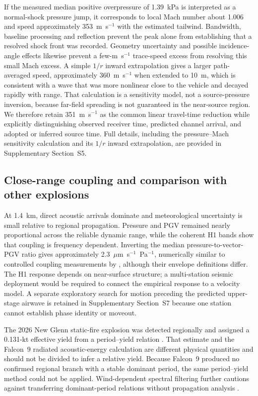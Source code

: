 \documentclass[]{seismica}
\begin{document}
If the measured median positive overpressure of 1.39~kPa is interpreted as
a normal-shock pressure jump, it corresponds to local Mach number about 1.006
and speed approximately 353~m~s$^{-1}$ with the estimated tailwind. Bandwidth,
baseline processing and reflection prevent the peak alone from establishing
that a resolved shock front was recorded. Geometry uncertainty and possible
incidence-angle effects likewise prevent a few-m~s$^{-1}$ trace-speed excess
from resolving this small Mach excess. A simple $1/r$ inward extrapolation gives a larger
path-averaged speed, approximately 360~m~s$^{-1}$ when extended to 10~m, which
is consistent with a wave that was more nonlinear close to the vehicle and
decayed rapidly with range. That calculation is a sensitivity model, not a
source-pressure inversion, because far-field spreading is not guaranteed in
the near-source region. We therefore retain 351~m~s$^{-1}$ as the common linear
travel-time reduction while explicitly distinguishing observed receiver time,
predicted channel arrival, and adopted or inferred source time. Full details,
including the pressure--Mach sensitivity calculation and its $1/r$ inward
extrapolation, are provided in Supplementary Section~S5.

\subsection{Close-range coupling and comparison with other explosions}

At 1.4~km, direct acoustic arrivals dominate and meteorological uncertainty is
small relative to regional propagation. Pressure and PGV remained nearly
proportional across the reliable dynamic range, while the coherent H1 bands
show that coupling is frequency dependent. Inverting the median pressure-to-vector-PGV ratio gives approximately
2.3~$\mu$m~s$^{-1}$~Pa$^{-1}$, numerically similar to controlled coupling
measurements by \citet{novoselov_ground_coupling_2020}, although their envelope
definitions differ. The H1 response depends on near-surface structure; a
multi-station seismic deployment would be required to connect the empirical
response to a velocity model. A separate exploratory search for motion
preceding the predicted upper-stage airwave is retained in Supplementary
Section~S7 because one station cannot establish phase identity or moveout.

The 2026 New Glenn static-fire explosion was detected regionally and assigned
a 0.131-kt effective yield from a period--yield relation
\citep{silber_scamfer_newglenn_2026}. That estimate and the Falcon~9 radiated
acoustic-energy calculation are different physical quantities and should not
be divided to infer a relative yield. Because Falcon~9 produced no confirmed
regional branch with a stable dominant period, the same period--yield method
could not be applied. Wind-dependent spectral filtering further cautions
against transferring dominant-period relations without propagation analysis
\citep{silber_wind_filtering_2026}.
\end{document}

